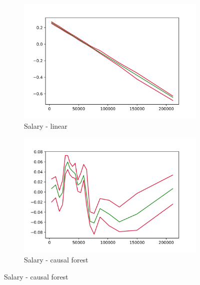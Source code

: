 \begin{figure}[h]
    \begin{subfigure}{0.5\linewidth}
        \includegraphics[width=\linewidth]{figures/ALE/chSNDexp/spec3_linear_FSALARYM.png}
        \caption{Salary - linear}
    \end{subfigure}%
    \begin{subfigure}{0.5\linewidth}
        \includegraphics[width=\linewidth]{figures/ALE/chSNDexp/spec3_cf_FSALARYM.png}
        \caption{Salary - causal forest}
    \end{subfigure}


\end{figure}
